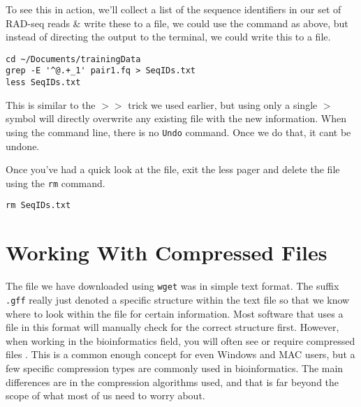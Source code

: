 \begin{steps}
To see this in action, we'll collect a list of the sequence identifiers in our set of RAD-seq reads \& write these to a file, we could use the command as above, but instead of directing the output to the terminal, we could write this to a file.
\end{steps}
\begin{lstlisting}
cd ~/Documents/trainingData
grep -E '^@.+_1' pair1.fq > SeqIDs.txt
less SeqIDs.txt
\end{lstlisting}

\begin{information}
This is similar to the $>>$ trick we used earlier, but using only a single $>$ symbol will directly overwrite any existing file with the new information.
When using the command line, there is no \texttt{Undo} command.
Once we do that, it cant be undone.
\end{information}

Once you've had a quick look at the file, exit the less pager and delete the file using the \texttt{rm} command.
\begin{lstlisting}
rm SeqIDs.txt
\end{lstlisting}

\section{Working With Compressed Files}

\begin{information}
The file we have downloaded using \texttt{wget} was in simple text format.
The suffix \texttt{.gff} really just denoted a specific structure within the text file so that we know where to look within the file for certain information.
Most software that uses a file in this format will manually check for the correct structure first.
However, when working in the bioinformatics field,  you will often see or require compressed files .
This is a common enough concept for even Windows and MAC users, but a few specific compression types are commonly used in bioinformatics.
The main differences are in the compression algorithms used, and that is far beyond the scope of what most of us need to worry about.
\end{information}


